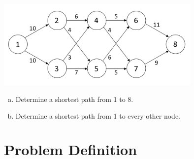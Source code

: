 \documentclass[12pt]{article}
\theoremstyle{definition}
\begin{document}






\begin{center}
\includegraphics[width=10cm]{shortestpathexample2}
\end{center}

\begin{enumerate}[a.]
\item Determine a shortest path from 1 to 8.
\vfill

\item Determine a shortest path from 1 to every other node.
\vfill



\end{enumerate}

\newpage


\section{Problem Definition}
\end{document}
